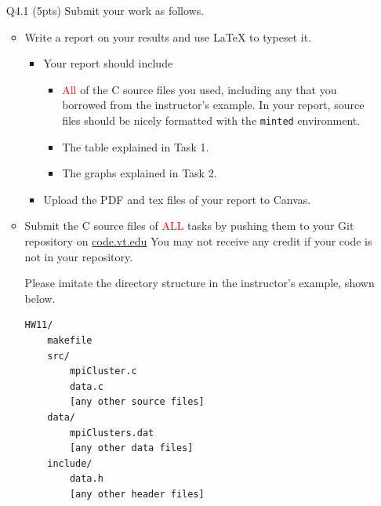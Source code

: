 \begin{itemize}
    \item[Q4.1] (5pts) Submit your work as follows.
    \begin{itemize}
        \item Write a report on your results and use \LaTeX{} to typeset it.
        \begin{itemize}
            \item  Your report should include
            \begin{itemize}
                \item \textcolor{red}{All} of the C source files you used, including any that you borrowed from the instructor's example.
                In your report, source files should be nicely formatted with the \texttt{minted} environment.
                \item The table explained in Task 1.
                \item The graphs explained in Task 2.
            \end{itemize}
            \item Upload the PDF and tex files of your report to Canvas.
        \end{itemize}
        \item Submit the C source files of \textcolor{red}{ALL} tasks by pushing them to your Git repository on \href{http://code.vt.edu}{code.vt.edu}
        You may not receive any credit if your code is not in your repository.
        
        Please imitate the directory structure in the instructor's example, shown below.
\begin{verbatim}
HW11/
    makefile
    src/
        mpiCluster.c
        data.c
        [any other source files]
    data/
        mpiClusters.dat
        [any other data files]
    include/
        data.h
        [any other header files]
\end{verbatim}
    \end{itemize}
\end{itemize}
